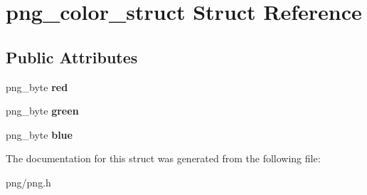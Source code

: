 \hypertarget{structpng__color__struct}{}\section{png\+\_\+color\+\_\+struct Struct Reference}
\label{structpng__color__struct}
\subsection*{Public Attributes}
\begin{DoxyCompactItemize}
\item 
png\+\_\+byte {\bfseries red}\hypertarget{structpng__color__struct_ad39dc2d7cb82e3670a3ad397bb4083cb}{}\label{structpng__color__struct_ad39dc2d7cb82e3670a3ad397bb4083cb}

\item 
png\+\_\+byte {\bfseries green}\hypertarget{structpng__color__struct_ada9b5a911b185eaf7c6b87934e9f11ce}{}\label{structpng__color__struct_ada9b5a911b185eaf7c6b87934e9f11ce}

\item 
png\+\_\+byte {\bfseries blue}\hypertarget{structpng__color__struct_a528e625b2778e787dc182e5df1164bbc}{}\label{structpng__color__struct_a528e625b2778e787dc182e5df1164bbc}

\end{DoxyCompactItemize}


The documentation for this struct was generated from the following file\+:\begin{DoxyCompactItemize}
\item 
png/png.\+h\end{DoxyCompactItemize}
